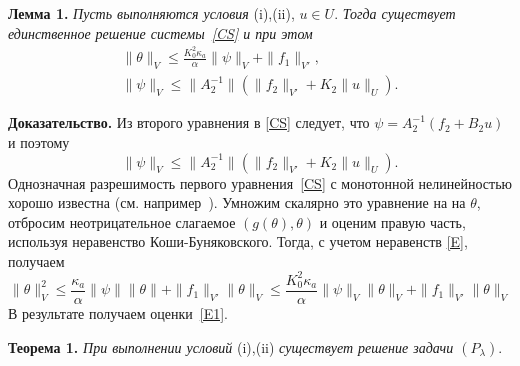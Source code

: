 \documentclass[12pt]{article}
\begin{document}
    \textbf{Лемма 1.}
    {\it
    Пусть выполняются условия} (i),(ii), $u\in U$. {\it Тогда
    существует единственное решение системы~\eqref{CS} и при этом}
    \begin{equation}
        \label{E1}
        \begin{aligned}
             \|\theta\|_V \leq 
        \frac{K_0^2\kappa_a}{\alpha}\|\psi\|_V+\|f_1\|_{V'}, \\
            \|\psi\|_V\leq \|A_2^{-1}\|\left(\|f_2\|_{V'}+K_2\|u\|_U\right). 
        \end{aligned}
    \end{equation}

    {\bf Доказательство.}
 Из второго уравнения в \eqref{CS} следует, что $\psi=A_2^{-1}(f_2+B_2u)$  и поэтому 
 $$
 \|\psi\|_V\leq \|A_2^{-1}\|\left(\|f_2\|_{V'}+K_2\|u\|_U\right).
 $$ 
    Однозначная разрешимость первого уравнения~\eqref{CS} с монотонной нелинейностью хорошо известна (см.
    например~\cite{Kufner}). Умножим скалярно это уравнение на
    на $\theta $, отбросим неотрицательное
    слагаемое $(g(\theta),\theta)$ и оценим правую часть, используя неравенство Коши-Буняковского.
    Тогда, с учетом неравенств \eqref{E}, получаем
    \[
        \|\theta\|^2_V \leq \frac{\kappa_a}{\alpha}\|\psi\|\|\theta\|+\|f_1\|_{V'}\|\theta\|_V\leq
        \frac{K_0^2\kappa_a}{\alpha}\|\psi\|_V\|\theta\|_V+\|f_1\|_{V'}\|\theta\|_V
    \]
        В результате получаем оценки~\eqref{E1}.

        \textbf{Теорема 1.}
    {\it
    При выполнении условий} (i),(ii)
        {\it существует решение задачи $(P_\lambda).$
    }
\end{document}
